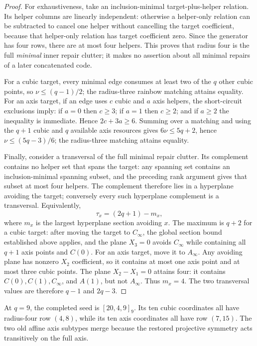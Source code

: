 \documentclass[11pt]{article}
\theoremstyle{definition}
\theoremstyle{remark}
\begin{document}
\begin{proof}
For exhaustiveness, take an inclusion-minimal target-plus-helper relation.
Its helper columns are linearly independent: otherwise a helper-only
relation can be subtracted to cancel one helper without cancelling the
target coefficient, because that helper-only relation has target coefficient
zero.  Since the generator has four rows, there are at most
four helpers.  This proves that radius four is the full \emph{minimal} inner
repair clutter; it makes no assertion about all minimal repairs of a later
concatenated code.

For a cubic target, every minimal edge consumes at least two of the $q$
other cubic points, so $\nu\le(q-1)/2$; the radius-three rainbow matching
attains equality.  For an axis target, if an edge uses $c$ cubic and $a$
axis helpers, the short-circuit exclusions imply: if $a=0$ then $c\ge3$; if
$a=1$ then $c\ge2$; and if $a\ge2$ the inequality is immediate.  Hence
$2c+3a\ge6$.  Summing over a matching
and using the $q+1$ cubic and $q$ available axis resources gives
$6\nu\le5q+2$, hence $\nu\le(5q-3)/6$; the radius-three matching attains
equality.

Finally, consider a transversal of the full minimal repair clutter.  Its
complement contains no helper set that spans the target: any spanning set
contains an inclusion-minimal spanning subset, and the preceding rank
argument gives that subset at most four helpers.  The complement therefore
lies in a hyperplane avoiding the target; conversely every such hyperplane
complement is a transversal.
Equivalently,
\[
 \tau_x=(2q+1)-m_x,
\]
where $m_x$ is the largest hyperplane section avoiding $x$.  The maximum is
$q+2$ for a cubic target: after moving the target to $C_\infty$, the global
section bound established above applies, and the plane
$X_3=0$ avoids $C_\infty$ while containing all $q+1$ axis points and
$C(0)$.  For an axis target, move it to $A_\infty$.  Any avoiding plane has
nonzero $X_2$ coefficient, so it contains at most one axis point and at most
three cubic points.  The plane $X_2-X_1=0$ attains four: it contains
$C(0),C(1),C_\infty$, and $A(1)$, but not $A_\infty$.  Thus $m_x=4$.
The two transversal values are therefore $q-1$ and $2q-3$.
\end{proof}

At $q=9$, the completed seed is $[20,4,9]_9$.  Its ten cubic coordinates
all have radius-four row $(4,8)$, while its ten axis coordinates all have
row $(7,15)$.  The two old affine axis subtypes merge because the restored
projective symmetry acts transitively on the full axis.
\end{document}
